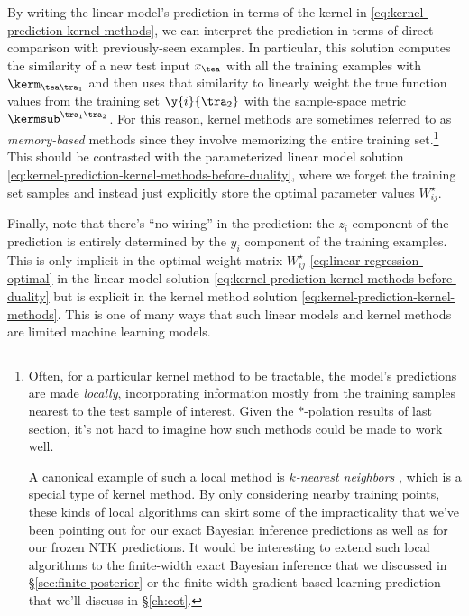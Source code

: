 By writing the linear model's prediction in terms of the kernel in \eqref{eq:kernel-prediction-kernel-methods}, we can interpret the prediction in terms of direct comparison with previously-seen examples. In particular, this solution computes the similarity of a new test input $x_{\tea}$ with all the training examples with $ \kerm_{\tea \tra_1}$ and then uses that similarity to linearly weight the true function values  from the training set $\y{i}{\tra_2}$ with the sample-space metric $\kermsub^{\tra_1 \tra_2}$.
For this reason, kernel methods are sometimes referred to as \emph{memory-based} methods since they involve memorizing the entire training set.\footnote{Often, for a particular kernel method to be tractable, the model's predictions are made \emph{locally}, incorporating information mostly from the training samples nearest to the test sample of interest. Given the $\ast$-polation results of last section, it's not hard to imagine how such methods could be made to work well.

A canonical example of such a local method is \emph{$k$-nearest neighbors} \cite{fix1952discriminatory,Cover1967NearestNP}, which is a special type of kernel method.  By only considering nearby training points, these kinds of local algorithms can skirt some of the impracticality that we've been pointing out for our exact Bayesian inference predictions as well as for our frozen NTK predictions.
It would be interesting to extend such local algorithms to the finite-width exact Bayesian inference that we discussed in \S\ref{sec:finite-posterior} or the finite-width gradient-based learning prediction that we'll discuss in \S\ref{ch:eot}.
}
This should be contrasted with the parameterized linear model solution \eqref{eq:kernel-prediction-kernel-methods-before-duality}, where we forget the training set samples and instead just explicitly store the optimal parameter values $W^{\star}_{ij}$. 


Finally, note that 
there's ``no wiring'' in the prediction: the $z_i$ component of the prediction is entirely determined by the $y_i$ component of the training examples.
This is only implicit in the optimal weight matrix $W^{\star}_{ij}$ \eqref{eq:linear-regression-optimal} in the linear model solution \eqref{eq:kernel-prediction-kernel-methods-before-duality} but is explicit in the kernel method solution \eqref{eq:kernel-prediction-kernel-methods}.
This is one of many ways that such linear models and kernel methods are limited machine learning models.










